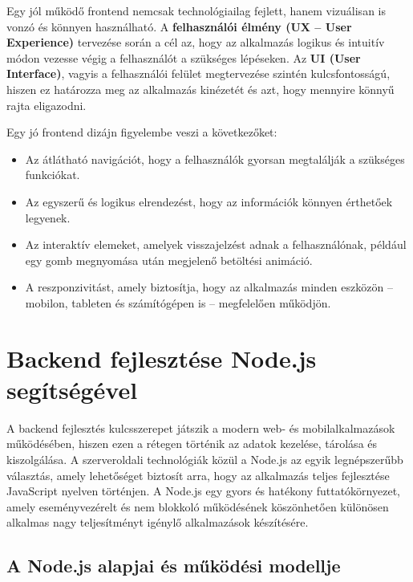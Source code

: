 \documentclass[
]{thesis-ekf}
\theoremstyle{definition}
\theoremstyle{remark}
\begin{document}
	Egy jól működő frontend nemcsak technológiailag fejlett, hanem vizuálisan is vonzó és könnyen használható. A \textbf{felhasználói élmény (UX – User Experience)} tervezése során a cél az, hogy az alkalmazás logikus és intuitív módon vezesse végig a felhasználót a szükséges lépéseken. Az \textbf{UI (User Interface)}, vagyis a felhasználói felület megtervezése szintén kulcsfontosságú, hiszen ez határozza meg az alkalmazás kinézetét és azt, hogy mennyire könnyű rajta eligazodni.
	
	Egy jó frontend dizájn figyelembe veszi a következőket:
	
	\begin{itemize}
		\item Az átlátható navigációt, hogy a felhasználók gyorsan megtalálják a szükséges funkciókat.
		
		\item Az egyszerű és logikus elrendezést, hogy az információk könnyen érthetőek legyenek.
		
		\item Az interaktív elemeket, amelyek visszajelzést adnak a felhasználónak, például egy gomb megnyomása után megjelenő betöltési animáció.
		
		\item A reszponzivitást, amely biztosítja, hogy az alkalmazás minden eszközön – mobilon, tableten és számítógépen is – megfelelően működjön.
	\end{itemize}
	
	\chapter{Backend fejlesztése Node.js segítségével}
	
A backend fejlesztés kulcsszerepet játszik a modern web- és mobilalkalmazások működésében, hiszen ezen a rétegen történik az adatok kezelése, tárolása és kiszolgálása. A szerveroldali technológiák közül a Node.js az egyik legnépszerűbb választás, amely lehetőséget biztosít arra, hogy az alkalmazás teljes fejlesztése JavaScript nyelven történjen. A Node.js egy gyors és hatékony futtatókörnyezet, amely eseményvezérelt és nem blokkoló működésének köszönhetően különösen alkalmas nagy teljesítményt igénylő alkalmazások készítésére.

\section{A Node.js alapjai és működési modellje}
\end{document}
